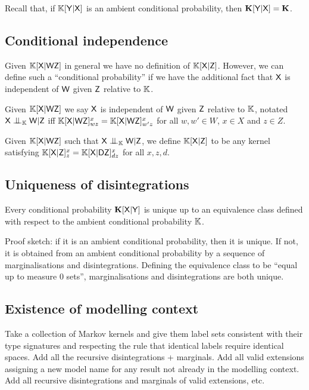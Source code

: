 Recall that, if $\mathbb{K}[\mathsf{Y}|\mathsf{X}]$ is an ambient conditional probability, then $\mathbf{K}[\mathsf{Y}|\mathsf{X}]=\mathbf{K}$.

\subsection{Conditional independence}\label{ssec:cond_indep}

Given $\mathbb{K}[\mathsf{X}|\mathsf{W}\mathsf{Z}]$ in general we have no definition of $\mathbb{K}[\mathsf{X}|\mathsf{Z}]$. However, we can define such a ``conditional probability'' if we have the additional fact that $\mathsf{X}$ is independent of $\mathsf{W}$ given $\mathsf{Z}$ relative to $\mathbb{K}$.

Given $\mathbb{K}[\mathsf{X}|\mathsf{W}\mathsf{Z}]$ we say $\mathsf{X}$ is independent of $\mathsf{W}$ given $\mathsf{Z}$ relative to $\mathbb{K}$, notated $\RV{X}\CI_{\model{K}} \RV{W}|\RV{Z}$ iff $\mathbb{K}[\mathsf{X}|\mathsf{WZ}]_{wz}^x = \mathbb{K}[\mathsf{X}|\mathsf{WZ}]_{w'z}^x$ for all $w,w'\in W$, $x\in X$ and $z\in Z$.

Given $\mathbb{K}[\mathsf{X}|\mathsf{W}\mathsf{Z}]$ such that $\RV{X}\CI_{\model{K}} \RV{W}|\RV{Z}$, we define $\mathbb{K}[\mathsf{X}|\mathsf{Z}]$ to be any kernel satisfying $\mathbb{K}[\mathsf{X}|\mathsf{Z}]_z^x = \mathbb{K}[{\mathsf{X}|\mathsf{DZ}}]_{dz}^x$ for all $x,z,d$.

\subsection{Uniqueness of disintegrations}

Every conditional probability $\mathbf{K}[\mathsf{X}|\mathsf{Y}]$ is unique up to an equivalence class defined with respect to the ambient conditional probability $\mathbb{K}$.

Proof sketch: if it is an ambient conditional probability, then it is unique. If not, it is obtained from an ambient conditional probability by a sequence of marginalisations and disintegrations. Defining the equivalence class to be ``equal up to measure 0 sets'', marginalisations and disintegrations are both unique.

\subsection{Existence of modelling context}

Take a collection of Markov kernels and give them label sets consistent with their type signatures and respecting the rule that identical labels require identical spaces. Add all the recursive disintegrations + marginals. Add all valid extensions assigning a new model name for any result not already in the modelling context. Add all recursive disintegrations and marginals of valid extensions, etc.

